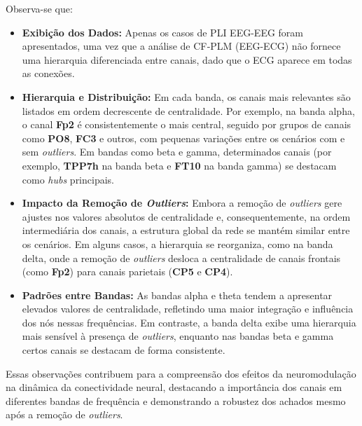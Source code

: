 Observa-se que:
\begin{itemize}
    \item \textbf{Exibição dos Dados:} Apenas os casos de PLI EEG-EEG foram apresentados, uma vez que a análise de CF‐PLM (EEG-ECG) não fornece uma hierarquia diferenciada entre canais, dado que o ECG aparece em todas as conexões.
    \item \textbf{Hierarquia e Distribuição:} Em cada banda, os canais mais relevantes são listados em ordem decrescente de centralidade. Por exemplo, na banda alpha, o canal \textbf{Fp2} é consistentemente o mais central, seguido por grupos de canais como \textbf{PO8}, \textbf{FC3} e outros, com pequenas variações entre os cenários com e sem \textit{outliers}. Em bandas como beta e gamma, determinados canais (por exemplo, \textbf{TPP7h} na banda beta e \textbf{FT10} na banda gamma) se destacam como \textit{hubs} principais.
    \item \textbf{Impacto da Remoção de \textit{Outliers}:} Embora a remoção de \textit{outliers} gere ajustes nos valores absolutos de centralidade e, consequentemente, na ordem intermediária dos canais, a estrutura global da rede se mantém similar entre os cenários. Em alguns casos, a hierarquia se reorganiza, como na banda delta, onde a remoção de \textit{outliers} desloca a centralidade de canais frontais (como \textbf{Fp2}) para canais parietais (\textbf{CP5} e \textbf{CP4}).
    \item \textbf{Padrões entre Bandas:} As bandas alpha e theta tendem a apresentar elevados valores de centralidade, refletindo uma maior integração e influência dos nós nessas frequências. Em contraste, a banda delta exibe uma hierarquia mais sensível à presença de \textit{outliers}, enquanto nas bandas beta e gamma certos canais se destacam de forma consistente.
\end{itemize}

Essas observações contribuem para a compreensão dos efeitos da neuromodulação na dinâmica da conectividade neural, destacando a importância dos canais em diferentes bandas de frequência e demonstrando a robustez dos achados mesmo após a remoção de \textit{outliers}.